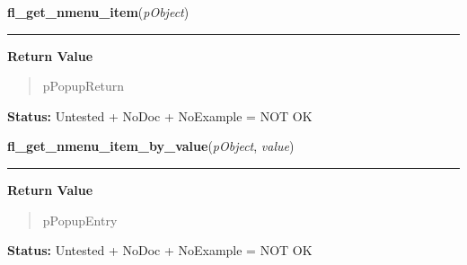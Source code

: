     \vspace{0.5ex}

\hspace{.8\funcindent}\begin{boxedminipage}{\funcwidth}

    \raggedright \textbf{fl\_get\_nmenu\_item}(\textit{pObject})

    \vspace{-1.5ex}

    \rule{\textwidth}{0.5\fboxrule}
\setlength{\parskip}{2ex}
\setlength{\parskip}{1ex}
      \textbf{Return Value}
    \vspace{-1ex}

      \begin{quote}
      pPopupReturn

      \end{quote}

\textbf{Status:} Untested + NoDoc + NoExample = NOT OK



    \end{boxedminipage}

    \label{xformslib:library:fl_get_nmenu_item_by_value}

    \vspace{0.5ex}

\hspace{.8\funcindent}\begin{boxedminipage}{\funcwidth}

    \raggedright \textbf{fl\_get\_nmenu\_item\_by\_value}(\textit{pObject}, \textit{value})

    \vspace{-1.5ex}

    \rule{\textwidth}{0.5\fboxrule}
\setlength{\parskip}{2ex}
\setlength{\parskip}{1ex}
      \textbf{Return Value}
    \vspace{-1ex}

      \begin{quote}
      pPopupEntry

      \end{quote}

\textbf{Status:} Untested + NoDoc + NoExample = NOT OK



    \end{boxedminipage}

    \label{xformslib:library:fl_get_nmenu_item_by_label}

